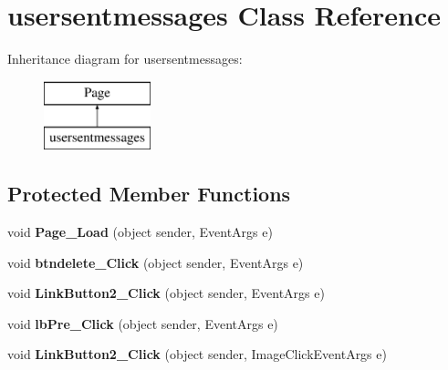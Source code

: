 \hypertarget{classusersentmessages}{\section{usersentmessages Class Reference}
\label{classusersentmessages}
}
Inheritance diagram for usersentmessages\-:\begin{figure}[H]
\begin{center}
\leavevmode
\includegraphics[height=2.000000cm]{classusersentmessages}
\end{center}
\end{figure}
\subsection*{Protected Member Functions}
\begin{DoxyCompactItemize}
\item 
\hypertarget{classusersentmessages_ab445f879aefe22399c718a1d919c4ba3}{void {\bfseries Page\-\_\-\-Load} (object sender, Event\-Args e)}\label{classusersentmessages_ab445f879aefe22399c718a1d919c4ba3}

\item 
\hypertarget{classusersentmessages_ab6690e8cbc16e863690db803a17840bc}{void {\bfseries btndelete\-\_\-\-Click} (object sender, Event\-Args e)}\label{classusersentmessages_ab6690e8cbc16e863690db803a17840bc}

\item 
\hypertarget{classusersentmessages_ab19ad9f15af5c332ac4ca01af58b336f}{void {\bfseries Link\-Button2\-\_\-\-Click} (object sender, Event\-Args e)}\label{classusersentmessages_ab19ad9f15af5c332ac4ca01af58b336f}

\item 
\hypertarget{classusersentmessages_a35b3995a84dfa1b34ca86281206f1e1e}{void {\bfseries lb\-Pre\-\_\-\-Click} (object sender, Event\-Args e)}\label{classusersentmessages_a35b3995a84dfa1b34ca86281206f1e1e}

\item 
\hypertarget{classusersentmessages_aa363756e43cab48d0a643c41bdd715c8}{void {\bfseries Link\-Button2\-\_\-\-Click} (object sender, Image\-Click\-Event\-Args e)}\label{classusersentmessages_aa363756e43cab48d0a643c41bdd715c8}

\end{DoxyCompactItemize}


